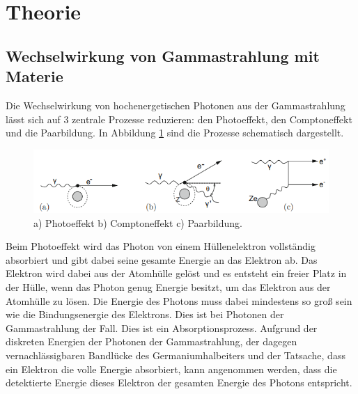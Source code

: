 \section{Theorie}
\label{sec:Theorie}
\subsection{Wechselwirkung von Gammastrahlung mit Materie}
Die Wechselwirkung von hochenergetischen Photonen aus der Gammastrahlung lässt sich auf 3 zentrale Prozesse reduzieren: den Photoeffekt, den Comptoneffekt und die Paarbildung.
In Abbildung \ref{fig:Wechselwirkung} sind die Prozesse schematisch dargestellt.
\begin{figure}[H]
    \centering
    \includegraphics[scale=1.0]{illustration/WWPhoton.png}
    \caption{a) Photoeffekt b) Comptoneffekt c) Paarbildung.\cite{Detektor}}
    \label{fig:Wechselwirkung}
\end{figure}
\noindent Beim Photoeffekt wird das Photon von einem Hüllenelektron vollständig absorbiert und gibt dabei seine gesamte Energie an das Elektron ab. Das Elektron wird dabei aus der Atomhülle gelöst und es entsteht ein freier Platz in der Hülle, 
wenn das Photon genug Energie besitzt, um das Elektron aus der Atomhülle zu lösen. Die Energie des Photons muss dabei mindestens so groß sein wie die Bindungsenergie des Elektrons.
Dies ist bei Photonen der Gammastrahlung der Fall. Dies ist ein Absorptionsprozess. Aufgrund der diskreten Energien der Photonen der Gammastrahlung, der dagegen vernachlässigbaren Bandlücke des Germaniumhalbeiters und 
der Tatsache, dass ein Elektron die volle Energie absorbiert, kann angenommen werden, dass die detektierte Energie dieses Elektron der gesamten 
Energie des Photons entspricht.

